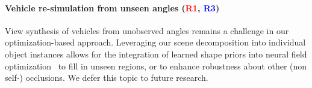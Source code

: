 \documentclass[10pt,twocolumn,letterpaper]{article}
\newcommand{\ROne}{{\textcolor{red}{\textbf{R1}}}}
\newcommand{\RThree}{{\textcolor{blue}{\textbf{R3}}}}
\begin{document}
\paragraph{Vehicle re-simulation from unseen angles (\ROne, \RThree)}
View synthesis of vehicles from unobserved angles remains a challenge in our optimization-based approach. Leveraging our scene decomposition into individual object instances allows for the integration of learned shape priors into neural field optimization~\cite{hypnerf2023} to fill in unseen regions, or to enhance robustness about other (non self-) occlusions. We defer this topic to future research.
\end{document}
